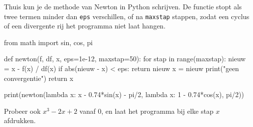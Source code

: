 Thuis kun je de methode van Newton in Python schrijven. De functie stopt als twee termen minder dan \texttt{eps} verschillen, of na \texttt{maxstap} stappen, zodat een cyclus of een divergente rij het programma niet laat hangen.

\begin{python}
from math import sin, cos, pi

def newton(f, df, x, eps=1e-12, maxstap=50):
    for stap in range(maxstap):
        nieuw = x - f(x) / df(x)
        if abs(nieuw - x) < eps:
            return nieuw
        x = nieuw
    print("geen convergentie")
    return x

print(newton(lambda x: x - 0.74*sin(x) - pi/2,
             lambda x: 1 - 0.74*cos(x), pi/2))
\end{python}

Probeer ook $x^3 - 2x + 2$ vanaf 0, en laat het programma bij elke stap $x$ afdrukken.

\opdrachtenkop

\begin{oefeningen}




















\end{oefeningen}



